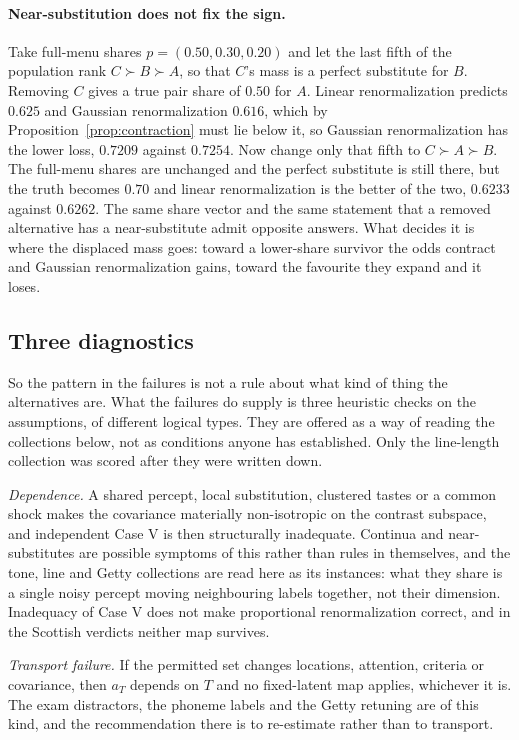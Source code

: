 \documentclass[11pt]{article}
\begin{document}
\paragraph{Near-substitution does not fix the sign.} Take full-menu shares
$p = (0.50, 0.30, 0.20)$ and let the last fifth of the population rank $C \succ B \succ A$, so
that $C$'s mass is a perfect substitute for $B$. Removing $C$ gives a true pair share of $0.50$
for $A$. Linear renormalization predicts $0.625$ and Gaussian renormalization $0.616$, which by
Proposition~\ref{prop:contraction} must lie below it, so Gaussian renormalization has the lower
loss, $0.7209$ against $0.7254$. Now change only that fifth to $C \succ A \succ B$. The full-menu
shares are unchanged and the perfect substitute is still there, but the truth becomes $0.70$ and
linear renormalization is the better of the two, $0.6233$ against $0.6262$. The same share vector
and the same statement that a removed alternative has a near-substitute admit opposite answers.
What decides it is where the displaced mass goes: toward a lower-share survivor the odds contract
and Gaussian renormalization gains, toward the favourite they expand and it loses.

\subsection{Three diagnostics}
\label{sec:diagnostics}

So the pattern in the failures is not a rule about what kind of thing the alternatives are.
What the failures do supply is three heuristic checks on the assumptions, of different logical
types. They are offered as a way of reading the collections below, not as conditions anyone has
established. Only the line-length collection was scored after they were written down.

\emph{Dependence.} A shared percept, local substitution, clustered tastes or a common shock makes
the covariance materially non-isotropic on the contrast subspace, and independent Case V is then
structurally inadequate. Continua and near-substitutes are possible symptoms of this rather than
rules in themselves, and the tone, line and Getty collections are read here as its instances: what
they share is a single noisy percept moving neighbouring labels together, not their dimension.
Inadequacy of Case V does not make proportional renormalization correct, and in the Scottish
verdicts neither map survives.

\emph{Transport failure.} If the permitted set changes locations, attention, criteria or
covariance, then $a_T$ depends on $T$ and no fixed-latent map applies, whichever it is. The exam
distractors, the phoneme labels and the Getty retuning are of this kind, and the recommendation
there is to re-estimate rather than to transport.
\end{document}
